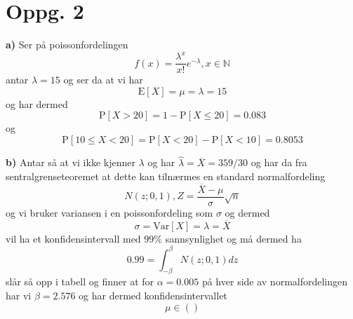 \documentclass{report}
\newcommand{\M}[2]{\mathbb{#1}^{#2}}
\newcommand{\nbrack}[1]{\left( #1 \right)}
\newcommand{\bbrack}[1]{\left[ #1 \right]}
\newcommand{\Var}[1]{\text{Var} \bbrack{ #1 }}
\newcommand{\std}[1]{\text{E} \bbrack{ #1 }}
\newcommand{\Prob}[1]{\text{P} \bbrack{ #1 }}
\begin{document}
\section*{Oppg. 2}
\textbf{a)}
Ser på poissonfordelingen
\begin{equation}
  \label{eq:6}
  f(x) = \frac{\lambda^{x}}{x!} e^{-\lambda}, x\in \M{N}{}
\end{equation}
antar $\lambda = 15$ og ser da at vi har
\begin{equation}
  \label{eq:7}
  \std{X} = \mu = \lambda = 15
\end{equation}
og har dermed
\begin{equation}
  \label{eq:8}
  \Prob{X>20} = 1 - \Prob{X\leq 20} = 0.083
\end{equation}
og
\begin{equation}
  \label{eq:9}
  \Prob{10\leq X < 20} = \Prob{X<20} - \Prob{X < 10} = 0.8053
\end{equation}

\textbf{b)}
Antar så at vi ikke kjenner $\lambda$ og har $\hat{\lambda} = \overline{X} = 359/30$ og har da fra sentralgrenseteoremet at dette kan tilnærmes en standard normalfordeling
\begin{equation}
  \label{eq:10}
  N(z; 0,1), Z = \frac{\overline{X} - \mu}{\sigma} \sqrt{n}
\end{equation}
og vi bruker variansen i en poissonfordeling som $\sigma$ og dermed
\begin{equation}
  \label{eq:13}
  \sigma = \Var{X} = \lambda = \overline{X}
\end{equation}
vil ha et konfidensintervall med $99\%$ sannsynlighet og må dermed ha
\begin{equation}
  \label{eq:11}
  0.99 = \int_{-\beta}^{\beta} N(z; 0, 1) dz
\end{equation}
slår så opp i tabell og finner at for $\alpha = 0.005$ på hver side av normalfordelingen har vi $\beta = 2.576$ og har dermed konfidensintervallet
\begin{equation}
  \label{eq:12}
  \mu \in \nbrack{  }
\end{equation}
\end{document}
